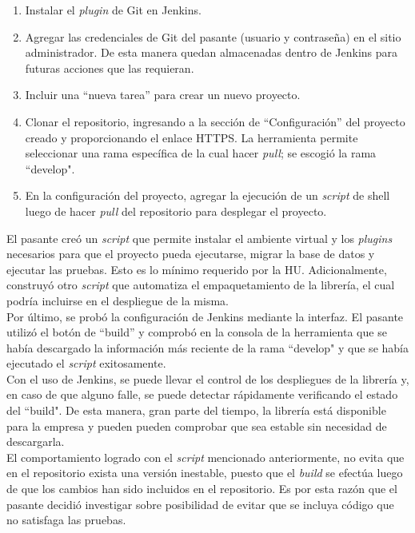\begin{enumerate}
    \item Instalar el \textit{plugin} de Git en Jenkins.
    \item Agregar las credenciales de Git del pasante (usuario y contraseña) en el sitio administrador. De esta manera quedan almacenadas dentro de Jenkins para futuras acciones que las requieran.
    \item Incluir una “nueva tarea” para crear un nuevo proyecto.
    \item Clonar el repositorio, ingresando a la sección de  “Configuración” del proyecto creado y proporcionando el enlace HTTPS. La herramienta permite seleccionar una rama específica de la cual hacer \textit{pull}; se escogió la rama “develop".
    \item En la configuración del proyecto, agregar la ejecución de un \textit{script} de shell luego de hacer \textit{pull} del repositorio para desplegar el proyecto.
\end{enumerate}

El pasante creó un \textit{script} que permite instalar el ambiente virtual y los \textit{plugins} necesarios para que el proyecto pueda ejecutarse, migrar la base de datos y ejecutar las pruebas. Esto es lo mínimo requerido por la HU. Adicionalmente, construyó otro \textit{script} que automatiza el empaquetamiento de la librería, el cual podría incluirse en el despliegue de la misma. \\

Por último, se probó la configuración de Jenkins mediante la interfaz. El pasante utilizó el botón de “build” y comprobó en la consola de la herramienta que se había descargado la información más reciente de la rama “develop" y que se había ejecutado el \textit{script} exitosamente. \\

Con el uso de Jenkins, se puede llevar el control de los despliegues de la librería y, en caso de que alguno falle, se puede detectar rápidamente verificando el estado del “build". De esta manera, gran parte del tiempo, la librería está disponible para la empresa y pueden  pueden comprobar que sea estable sin necesidad de descargarla. \\

El comportamiento logrado con el \textit{script} mencionado anteriormente, no evita que en el repositorio exista una versión inestable, puesto que el \textit{build} se efectúa luego de que los cambios han sido incluidos en el repositorio. Es por esta razón que el pasante decidió investigar sobre posibilidad de evitar que se incluya código que no satisfaga las pruebas. \\

